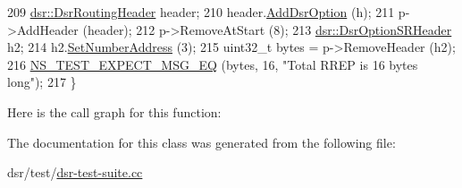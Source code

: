 \begin{DoxyCode}
209   \hyperlink{classns3_1_1dsr_1_1DsrRoutingHeader}{dsr::DsrRoutingHeader} header;
210   header.\hyperlink{classns3_1_1dsr_1_1DsrOptionField_acd03d07018e22f5e2b23975fae84fb3c}{AddDsrOption} (h);
211   p->AddHeader (header);
212   p->RemoveAtStart (8);
213   \hyperlink{classns3_1_1dsr_1_1DsrOptionSRHeader}{dsr::DsrOptionSRHeader} h2;
214   h2.\hyperlink{classns3_1_1dsr_1_1DsrOptionSRHeader_a611f37babb433a5c82b393089e23be51}{SetNumberAddress} (3);
215   uint32\_t bytes = p->RemoveHeader (h2);
216   \hyperlink{group__testing_ga7304ba46a28d8cf08dfdfd6499cf7068}{NS\_TEST\_EXPECT\_MSG\_EQ} (bytes, 16, \textcolor{stringliteral}{"Total RREP is 16 bytes long"});
217 \}
\end{DoxyCode}


Here is the call graph for this function\+:




The documentation for this class was generated from the following file\+:\begin{DoxyCompactItemize}
\item 
dsr/test/\hyperlink{dsr-test-suite_8cc}{dsr-\/test-\/suite.\+cc}\end{DoxyCompactItemize}
